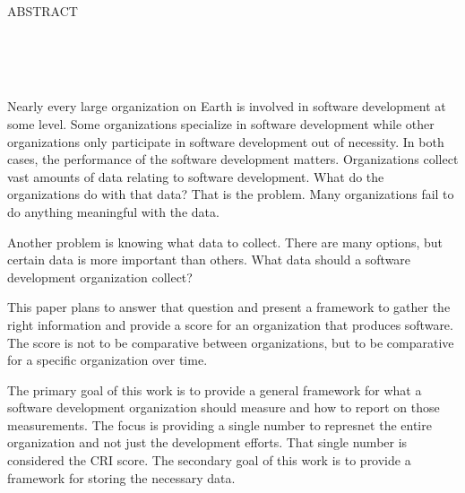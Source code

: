 \documentclass[SDSUThesis.tex]{subfiles}
\begin{document}
\newpage
\doublespacing

\begin{center}
ABSTRACT\\

\yourtitle \\
\yourname \\
\number\year\\
\end{center}

\par
Nearly every large organization on Earth is involved in software development at some level.  Some organizations
specialize in software development while other organizations only participate in software development out of
necessity. In both cases, the performance of the software development matters.  Organizations collect
vast amounts of data relating to software development.  What do the organizations do with that data? 
That is the problem.  Many organizations fail to do anything meaningful with the data.  

Another problem is knowing what data to collect.  There are many options, but certain data is more important than
others.  What data should a software development organization collect?

This paper plans to answer that question and present a framework to gather the 
right information and provide a score for an organization that
produces software.  The score is not to be comparative between organizations, but to be comparative for a specific
organization over time.  

The primary goal of this work is to provide a general framework for what a software development organization
should measure and how to report on those measurements.  The focus is providing a single number
to represnet the entire
organization and not just the development efforts.  That single number is considered the CRI score. The secondary goal of this work is to provide
a framework for storing the necessary data.
\end{document}

